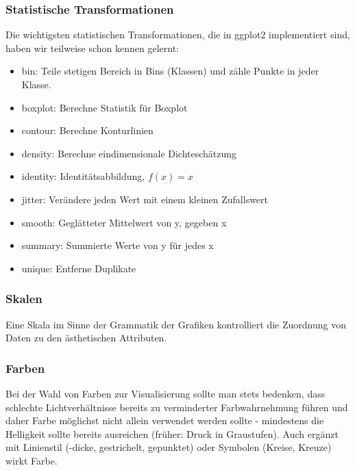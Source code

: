 \begin{frame}
  \frametitle{Statistische Transformationen}
  Die wichtigsten statistischen Transformationen, die in ggplot2 implementiert sind, haben wir teilweise schon kennen gelernt:
  \begin{itemize}
\item bin: Teile stetigen Bereich in Bins (Klassen) und zähle Punkte in jeder Klasse.
\item boxplot: Berechne Statistik für Boxplot
\item contour: Berechne Konturlinien
\item density: Berechne eindimensionale Dichteschätzung
\item identity: Identitätsabbildung, $f(x) = x$
\item jitter: Verändere jeden Wert mit einem kleinen Zufallswert
\item smooth: Geglätteter Mittelwert von y, gegeben x
\item summary: Summierte Werte von y für jedes x
\item unique: Entferne Duplikate
\end{itemize}
\end{frame}

\begin{frame}
  \frametitle{Skalen}
Eine Skala im Sinne der Grammatik der Grafiken kontrolliert die Zuordnung von Daten zu den ästhetischen Attributen.

\vspace{0.3cm}


\vspace{0.3cm}

\end{frame}


\begin{frame}
  \frametitle{Farben}
  Bei der Wahl von Farben zur Visualisierung sollte man stets bedenken, dass schlechte Lichtverhältnisse bereits zu verminderter Farbwahrnehmung führen und daher Farbe möglichst nicht allein verwendet werden sollte - mindestens die Helligkeit sollte bereits ausreichen (früher: Druck in Graustufen). Auch ergänzt mit Linienstil (-dicke, gestrichelt, gepunktet) oder Symbolen (Kreise, Kreuze) wirkt Farbe.

  \vspace{1cm}

\end{frame}

